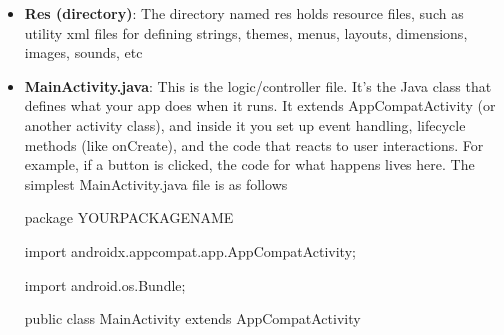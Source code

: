 \documentclass{report}
\begin{document}
\begin{itemize}
        \item \textbf{Res (directory)}: The directory named res holds resource files, such as utility xml files for defining strings, themes, menus, layouts, dimensions, images, sounds, etc
        \item \textbf{MainActivity.java}: This is the logic/controller file. It’s the Java class that defines what your app does when it runs. It extends AppCompatActivity (or another activity class), and inside it you set up event handling, lifecycle methods (like onCreate), and the code that reacts to user interactions. For example, if a button is clicked, the code for what happens lives here.
            \bigbreak \noindent 
            The simplest MainActivity.java file is as follows
            \bigbreak \noindent 
            \begin{javacode}
                package YOURPACKAGENAME

                import androidx.appcompat.app.AppCompatActivity;

                import android.os.Bundle;

                public class MainActivity extends AppCompatActivity {

}
\end{javacode}
\end{itemize}
\end{document}
